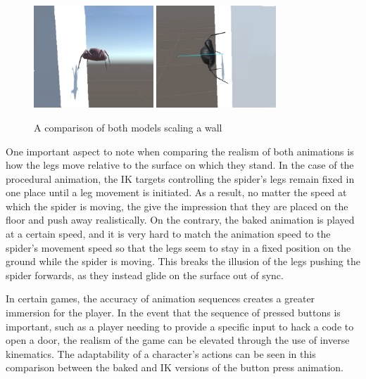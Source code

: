 \begin{figure}[h!]
    \centering
    \captionsetup{justification=centering}
    \includegraphics[width=0.4\textwidth]{grafika/sp_b_wall.eps}
    \includegraphics[width=0.4\textwidth]{grafika/sp_ik_wall.eps}
    \caption{A comparison of both models scaling a wall}
    \label{fig:sp_wall}
\end{figure}

One important aspect to note when comparing the realism of both animations is
how the legs move relative to the surface on which they stand. In the case of
the procedural animation, the IK targets controlling the spider's legs remain
fixed in one place until a leg movement is initiated. As a result, no matter the
speed at which the spider is moving, the give the impression that they are
placed on the floor and push away realistically. On the contrary, the baked
animation is played at a certain speed, and it is very hard to match the
animation speed to the spider's movement speed so that the legs seem to stay in a fixed
position on the ground while the spider is moving. This breaks the illusion of
the legs pushing the spider forwards, as they instead glide on the surface out
of sync.

In certain games, the accuracy of animation sequences creates a greater
immersion for the player. In the event that the sequence of pressed buttons is
important, such as a player needing to provide a specific input to hack a code
to open a door, the realism of the game can be elevated through the use of
inverse kinematics. The adaptability of a character's actions can be seen in this
comparison between the baked and IK versions of the button press animation.


